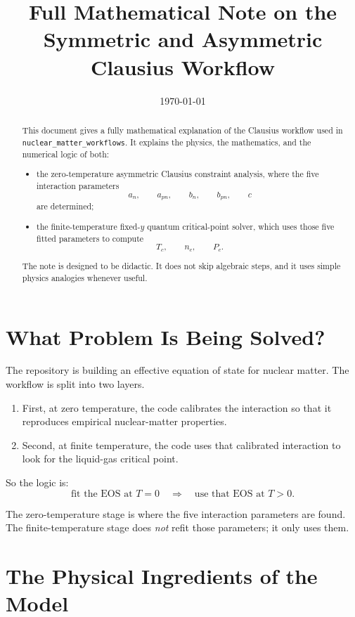 \documentclass[11pt]{article}
\title{Full Mathematical Note on the Symmetric and Asymmetric Clausius Workflow}
\author{}
\date{\today}
\begin{document}
\maketitle

\begin{abstract}
This document gives a fully mathematical explanation of the Clausius workflow
used in \texttt{nuclear\_matter\_workflows}. It explains the physics, the
mathematics, and the numerical logic of both:
\begin{itemize}
\item the zero-temperature asymmetric Clausius constraint analysis, where the
five interaction parameters
\[
a_n,\qquad a_{pn},\qquad b_n,\qquad b_{pn},\qquad c
\]
are determined;
\item the finite-temperature fixed-$y$ quantum critical-point solver, which
uses those five fitted parameters to compute
\[
T_c,\qquad n_c,\qquad P_c.
\]
\end{itemize}

The note is designed to be didactic. It does not skip algebraic steps, and it
uses simple physics analogies whenever useful.
\end{abstract}

\tableofcontents

\section{What Problem Is Being Solved?}

The repository is building an effective equation of state for nuclear matter.
The workflow is split into two layers.

\begin{enumerate}
\item First, at zero temperature, the code calibrates the interaction so that
it reproduces empirical nuclear-matter properties.
\item Second, at finite temperature, the code uses that calibrated interaction
to look for the liquid-gas critical point.
\end{enumerate}

So the logic is:
\[
\text{fit the EOS at } T=0
\quad \Longrightarrow \quad
\text{use that EOS at } T>0.
\]

The zero-temperature stage is where the five interaction parameters are found.
The finite-temperature stage does \emph{not} refit those parameters; it only
uses them.

\section{The Physical Ingredients of the Model}
\end{document}
